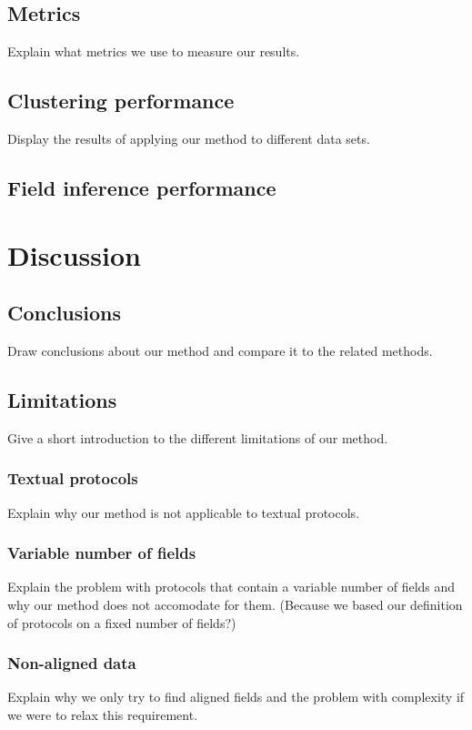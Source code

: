\documentclass[a4paper]{report}
\begin{document}
\section{Metrics}
Explain what metrics we use to measure our results.

\section{Clustering performance}
Display the results of applying our method to different data sets.

\section{Field inference performance}

\chapter{Discussion}

\section{Conclusions}
Draw conclusions about our method and compare it to the related methods.

\section{Limitations}
Give a short introduction to the different limitations of our method.

\subsection{Textual protocols}
Explain why our method is not applicable to textual protocols.

\subsection{Variable number of fields}
Explain the problem with protocols that contain a variable number of fields and
why our method does not accomodate for them. (Because we based our definition
of protocols on a fixed number of fields?)

\subsection{Non-aligned data}
Explain why we only try to find aligned fields and the problem with complexity
if we were to relax this requirement.
\end{document}
